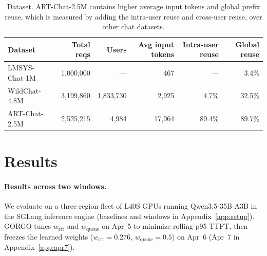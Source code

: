 \documentclass{article}
\begin{document}
\begin{table}[t]
\centering
\small
\caption{Dataset. ART-Chat-2.5M contains higher average input tokens and global prefix reuse, which is measured by
adding the intra-user reuse and cross-user reuse, over other chat datasets.}
\label{tab:datasets}
\begin{tabular}{lrrrrr}
\toprule
Dataset & Total reqs & Users & Avg input tokens & Intra-user reuse & Global reuse \\
\midrule
LMSYS-Chat-1M & 1{,}000{,}000 & --- & 467 & --- & 3.4\% \\
WildChat-4.8M & 3{,}199{,}860 & 1{,}833{,}730 & 2{,}925 & 4.7\% & 32.5\% \\
ART-Chat-2.5M & 2{,}525{,}215 & 4{,}984 & 17{,}964 & 89.4\% & 89.7\% \\
\bottomrule
\end{tabular}
\end{table}

\section{Results}
\label{sec:results}

\paragraph{Results across two windows.}
We evaluate on a three-region fleet of L40S GPUs running Qwen3.5-35B-A3B in the SGLang inference engine (baselines and windows in Appendix~\ref{app:setup}). GORGO tunes $w_{\mathrm{rtt}}$ and $w_{\mathrm{queue}}$ on Apr~5 to minimize rolling p95 TTFT, then freezes the learned weights ($w_{\mathrm{rtt}}{=}0.276$, $w_{\mathrm{queue}}{=}0.5$) on Apr~6 (Apr~7 in Appendix~\ref{app:apr7}).
\end{document}
